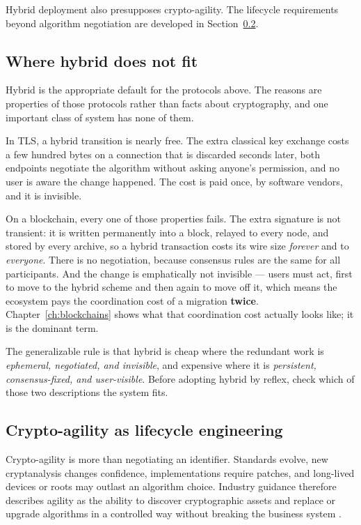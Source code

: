 Hybrid deployment also presupposes crypto-agility. The lifecycle requirements
beyond algorithm negotiation are developed in
Section~\ref{sec:crypto-agility}.

\subsection{Where hybrid does not fit}
\label{sec:hybrid-limits}

Hybrid is the appropriate default for the protocols above. The reasons are
properties of those protocols rather than facts about cryptography, and one
important class of system has none of them.

In TLS, a hybrid transition is nearly free. The extra classical key exchange
costs a few hundred bytes on a connection that is discarded seconds later, both
endpoints negotiate the algorithm without asking anyone's permission, and no user
is aware the change happened. The cost is paid once, by software vendors, and it
is invisible.

On a blockchain, every one of those properties fails. The extra signature is not
transient: it is written permanently into a block, relayed to every node, and
stored by every archive, so a hybrid transaction costs its wire size
\emph{forever} and to \emph{everyone}. There is no negotiation, because consensus
rules are the same for all participants. And the change is emphatically not
invisible --- users must act, first to move to the hybrid scheme and then again
to move off it, which means the ecosystem pays the coordination cost of a
migration \textbf{twice}. Chapter~\ref{ch:blockchains} shows what that
coordination cost actually looks like; it is the dominant term.

The generalizable rule is that hybrid is cheap where the redundant work is
\emph{ephemeral, negotiated, and invisible}, and expensive where it is
\emph{persistent, consensus-fixed, and user-visible}. Before adopting hybrid by
reflex, check which of those two descriptions the system fits.

\subsection{Crypto-agility as lifecycle engineering}
\label{sec:crypto-agility}

Crypto-agility is more than negotiating an identifier. Standards evolve, new
cryptanalysis changes confidence, implementations require patches, and long-lived
devices or roots may outlast an algorithm choice. Industry guidance therefore
describes agility as the ability to discover cryptographic assets and replace or
upgrade algorithms in a controlled way without breaking the business system
\cite{keyfactoragility}.

